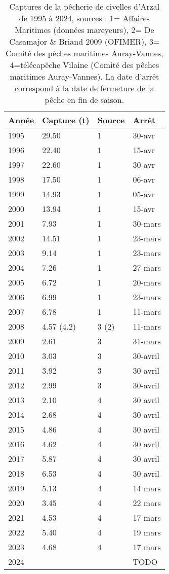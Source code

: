 \documentclass[10pt,twocolumn,titlepage,twoside]{article}\usepackage[]{graphicx}\usepackage[]{xcolor}
\begin{document}
\begin{table}[htpb]
\centering
\caption{Captures de la pêcherie de civelles d'Arzal de 1995 à 2024, sources : 
1= Affaires Maritimes (données mareyeurs), 
2= De Casamajor \& Briand 2009 (OFIMER),
3= Comité des pêches maritimes Auray-Vannes,
4=télécapêche Vilaine (Comité des pêches maritimes Auray-Vannes). 
La date d'arrêt correspond à la date de fermeture de la pêche en fin de saison.}
\label{tableau_captures}
\begin{tabular}{llll}
\toprule
Année & Capture (t) & Source & Arrêt \\ 
\midrule
1995  & 29.50  &  1 & 30-avr \\
1996  & 22.40  &  1 & 15-avr \\
1997  & 22.60  &  1 & 30-avr \\
1998  & 17.50  &  1 & 06-avr \\
1999  & 14.93  &  1 & 05-avr \\
2000  & 13.94  &  1 & 15-avr \\
2001  & 7.93   &  1 & 30-mars \\
2002  & 14.51  &  1 & 23-mars \\
2003  & 9.14 &  1   & 23-mars \\
2004  & 7.26 &  1  & 27-mars \\
2005  & 6.72 &  1  & 20-mars \\
2006  & 6.99 &  1  & 23-mars \\
2007  & 6.78 &  1  & 11-mars \\
2008  & 4.57 (4.2) & 3 (2) & 11-mars\\
2009  & 2.61 & 3  & 31-mars \\
2010  & 3.03 & 3 & 30-avril \\
2011  & 3.92 & 3  & 30-avril \\
2012  & 2.99 & 3  & 30-avril \\
2013  & 2.10 & 4  & 30 avril \\
2014  & 2.68 & 4  & 30 avril \\
2015  & 4.86 & 4  & 30 avril \\
2016  & 4.62 & 4 &  30 avril\\  %
2017  & 5.87 & 4  & 30 avril \\ 
2018 & 6.53 &  4  & 30 avril \\ 
2019 & 5.13 &  4  &  14 mars\\ 
2020 & 3.45 &  4  &  22 mars \\ 
2021 & 4.53 &  4  &  17 mars \\
2022  & 5.40 & 4 & 19 mars \\ 
2023  & 4.68 & 4 & 17 mars \\
2024  &      &   &  TODO  \\
\bottomrule
\end{tabular}
\end{table}
\normalsize
\end{document}

